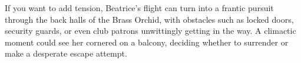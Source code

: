 \begin{GmTips}  
	If you want to add tension, Beatrice’s flight can turn into a frantic pursuit through the back halls of the Brass Orchid, with obstacles such as locked doors, security guards, or even club patrons unwittingly getting in the way. A climactic moment could see her cornered on a balcony, deciding whether to surrender or make a desperate escape attempt.  
\end{GmTips}  